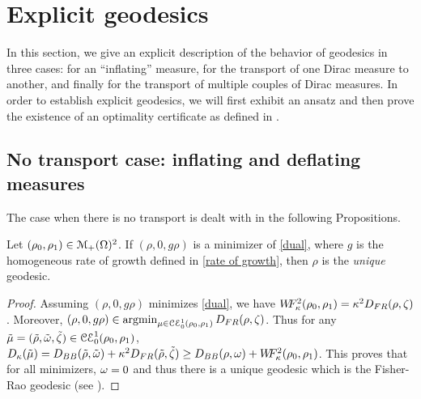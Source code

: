 
\section{Explicit geodesics}
\label{sec-explicit-geod}

In this section, we give an explicit description of the behavior of geodesics in three cases: for an ``inflating'' measure, for the transport of one Dirac measure to another, and finally for the transport of multiple couples of Dirac measures. In order to establish explicit geodesics, we will first exhibit an ansatz and then prove the existence of an optimality certificate as defined in .

\subsection{No transport case: inflating and deflating measures}

The case when there is no transport is dealt with in the following Propositions. 
\begin{proposition}
Let $(\rho_0,\rho_1) \in \mathcal{M}_+(\Omega)^2$. If $(\rho,0,g\rho)$ is a minimizer of \eqref{dual}, where $g$ is the homogeneous rate of growth defined in \eqref{rate of growth},
then $\rho$ is the \emph{unique} geodesic.
\end{proposition}
\begin{proof}
Assuming $(\rho,0,g\rho)$ minimizes \eqref{dual}, we have $W\! \! F_{\kappa}^2(\rho_0,\rho_1)= \kappa^2 D_{FR}(\rho,\zeta)$. Moreover, $(\rho,0,g\rho) \in \operatorname*{argmin}_{\mu \in \mathcal{CE}_0^1(\rho_0,\rho_1)} D_{FR}(\rho,\zeta)$.
 Thus for any $\tilde{\mu}=(\tilde{\rho}, \tilde{\omega}, \tilde{\zeta}) \in \mathcal{CE}_0^1(\rho_0,\rho_1)$, $D_{\kappa}(\tilde{\mu}) = D_{BB}(\tilde{\rho},\tilde{\omega}) + \kappa^2 D_{FR}(\tilde{\rho},\tilde{\zeta}) \geq D_{BB}(\rho,\omega) + W\! \! F_{\kappa}^2(\rho_0,\rho_1)$. This proves that for all minimizers, $\omega=0$ and thus there is a unique geodesic which is the Fisher-Rao geodesic (see ).
\end{proof}


